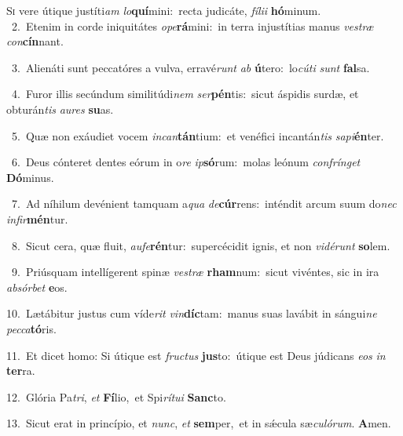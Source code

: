 \lettrine{\initial\textcolor{\initialcolor}{S}}{i} vere útique justíti\textit{am} \textit{lo}\-\textbf{quí}mini:~\star recta judicáte, \textit{fí}\-\textit{li}\textit{i} \textbf{hó}\-minum.\\
{\numbfont\textcolor{\numbcolor}{~2.}}~Etenim in corde iniquitátes \textit{o}\-\textit{pe}\textbf{rá}mini:~\star in terra injustítias manus \textit{ves}\-\textit{træ} \textit{con}\-\textbf{cín}nant.\par
{\numbfont\textcolor{\numbcolor}{~3.}}~Alienáti sunt peccatóres a vulva, erravé\textit{runt} \textit{ab} \textbf{ú}\-tero:~\star lo\-\textit{cú}\-\textit{ti} \textit{sunt} \textbf{fal}\-sa.\par
{\numbfont\textcolor{\numbcolor}{~4.}}~Furor illis secúndum similitúdi\textit{nem} \textit{ser}\-\textbf{pén}tis:~\star sicut áspidis surdæ, et obturán\textit{tis} \textit{au}\-\textit{res} \textbf{su}\-as.\par
{\numbfont\textcolor{\numbcolor}{~5.}}~Quæ non exáudiet vocem \textit{in}\-\textit{can}\textbf{tán}tium:~\star et venéfici incantán\textit{tis} \textit{sa}\-\textit{pi}\textbf{én}ter.\par
{\numbfont\textcolor{\numbcolor}{~6.}}~Deus cónteret dentes eórum in o\textit{re} \textit{ip}\-\textbf{só}rum:~\star molas leónum \textit{con}\-\textit{frín}\textit{get} \textbf{Dó}\-minus.\par
{\numbfont\textcolor{\numbcolor}{~7.}}~Ad níhilum devénient tamquam a\textit{qua} \textit{de}\-\textbf{cúr}rens:~\star inténdit arcum suum do\textit{nec} \textit{in}\-\textit{fir}\textbf{mén}tur.\par
{\numbfont\textcolor{\numbcolor}{~8.}}~Sicut cera, quæ fluit, \textit{au}\-\textit{fe}\textbf{rén}tur:~\star supercécidit ignis, et non \textit{vi}\-\textit{dé}\textit{runt} \textbf{so}\-lem.\par
{\numbfont\textcolor{\numbcolor}{~9.}}~Priúsquam intellígerent spinæ \textit{ves}\-\textit{træ} \textbf{rham}\-num:~\star sicut vivéntes, sic in ira \textit{ab}\-\textit{sór}\textit{bet} \textbf{e}\-os.\par
{\numbfont\textcolor{\numbcolor}{10.}}~Lætábitur justus cum víde\textit{rit} \textit{vin}\-\textbf{díc}tam:~\star manus suas lavábit in sángui\textit{ne} \textit{pec}\-\textit{ca}\textbf{tó}ris.\par
{\numbfont\textcolor{\numbcolor}{11.}}~Et dicet homo: Si útique est \textit{fruc}\-\textit{tus} \textbf{jus}\-to:~\star útique est Deus júdicans \textit{e}\-\textit{os} \textit{in} \textbf{ter}\-ra.\par
{\numbfont\textcolor{\numbcolor}{12.}}~Glória Pa\-\textit{tri}\-, \textit{et} \textbf{Fí}\-lio,~\star et Spi\-\textit{rí}\-\textit{tu}\textit{i} \textbf{Sanc}\-to.\par
{\numbfont\textcolor{\numbcolor}{13.}}~Sicut erat in princípio, et \textit{nunc}\-, \textit{et} \textbf{sem}\-per,~\star et in sǽcula sæ\-\textit{cu}\-\textit{ló}\textit{rum}. \textbf{A}\-men.\par
